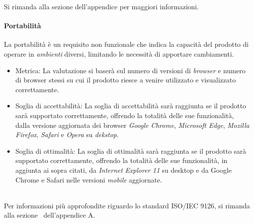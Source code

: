Si rimanda alla sezione dell'appendice per maggiori informazioni.

\paragraph{Portabilità}
La portabilità è un requisito non funzionale che indica la capacità del prodotto di operare in \textit{ambienti} diversi, limitando le necessità di apportare cambiamenti.
\begin{itemize}
	\item Metrica: La valutazione si baserà sul numero di versioni di \emph{browser} e numero di browser stessi su cui il prodotto riesce a venire utilizzato e visualizzato correttamente.
	\item Soglia di accettabilità: La soglia di accettabilità sarà raggiunta se il prodotto sarà supportato correttamente, offrendo la totalità delle sue funzionalità, dalla versione aggiornata dei browser \emph{Google Chrome}, \emph{Microsoft Edge}, \emph{Mozilla Firefox}, \emph{Safari} e \emph{Opera} su \emph{dekstop}.
	\item Soglia di ottimalità: La soglia di ottimalità sarà raggiunta se il prodotto sarà supportato correttamente, offrendo la totalità delle sue funzionalità, in aggiunta ai sopra citati, da \emph{Internet Explorer 11} su desktop e da Google Chrome e Safari nelle versioni \emph{mobile} aggiornate.
\end{itemize}

~\\
Per informazioni più approfondite riguardo lo standard ISO/IEC 9126, si rimanda alla sezione~ dell'appendice A.



